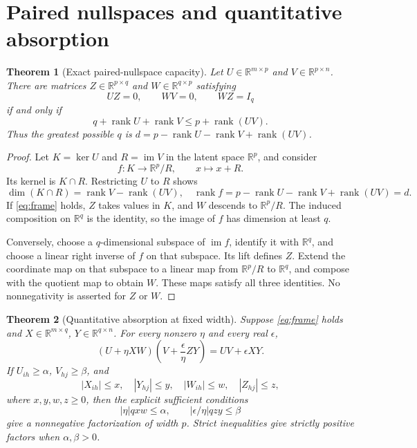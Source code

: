 \documentclass[11pt]{article}
\newtheorem{theorem}{Theorem}[section]
\theoremstyle{definition}\newtheorem{definition}[theorem]{Definition}
\theoremstyle{remark}\newtheorem{remark}[theorem]{Remark}
\newcommand{\rk}{\operatorname{rank}}
\newcommand{\im}{\operatorname{im}}
\newcommand{\R}{\mathbb R}
\begin{document}
\section{Paired nullspaces and quantitative absorption}

\begin{theorem}[Exact paired-nullspace capacity]\label{thm:capacity}
Let $U\in\R^{m\times p}$ and $V\in\R^{p\times n}$. There are matrices $Z\in\R^{p\times q}$ and $W\in\R^{q\times p}$ satisfying
\begin{equation}\label{eq:frame}
UZ=0,\qquad WV=0,\qquad WZ=I_q
\end{equation}
if and only if
\begin{equation}\label{eq:capacity}
q+\rk U+\rk V\le p+\rk(UV).
\end{equation}
Thus the greatest possible $q$ is $d=p-\rk U-\rk V+\rk(UV)$.
\end{theorem}

\begin{proof}
Let $K=\ker U$ and $R=\im V$ in the latent space $\R^p$, and consider
\[
f:K\longrightarrow\R^p/R,\qquad x\longmapsto x+R.
\]
Its kernel is $K\cap R$. Restricting $U$ to $R$ shows
\[
\dim(K\cap R)=\rk V-\rk(UV),
\quad \rk f=p-\rk U-\rk V+\rk(UV)=d.
\]
If \eqref{eq:frame} holds, $Z$ takes values in $K$, and $W$ descends to $\R^p/R$. The induced composition on $\R^q$ is the identity, so the image of $f$ has dimension at least $q$.

Conversely, choose a $q$-dimensional subspace of $\im f$, identify it with $\R^q$, and choose a linear right inverse of $f$ on that subspace. Its lift defines $Z$. Extend the coordinate map on that subspace to a linear map from $\R^p/R$ to $\R^q$, and compose with the quotient map to obtain $W$. These maps satisfy all three identities. No nonnegativity is asserted for $Z$ or $W$.
\end{proof}

\begin{theorem}[Quantitative absorption at fixed width]\label{thm:absorb}
Suppose \eqref{eq:frame} holds and $X\in\R^{m\times q}$, $Y\in\R^{q\times n}$. For every nonzero $\eta$ and every real $\epsilon$,
\begin{equation}\label{eq:identity}
\left(U+\eta XW\right)\left(V+\frac\epsilon\eta ZY\right)=UV+\epsilon XY.
\end{equation}
If $U_{ih}\ge\alpha$, $V_{hj}\ge\beta$, and
\[
|X_{ih}|\le x,\quad |Y_{hj}|\le y,\quad |W_{ih}|\le w,\quad |Z_{hj}|\le z,
\]
where $x,y,w,z\ge0$, then the explicit sufficient conditions
\begin{equation}\label{eq:budgets}
|\eta|qxw\le\alpha,\qquad |\epsilon/\eta|qzy\le\beta
\end{equation}
give a nonnegative factorization of width $p$. Strict inequalities give strictly positive factors when $\alpha,\beta>0$.
\end{theorem}
\end{document}
